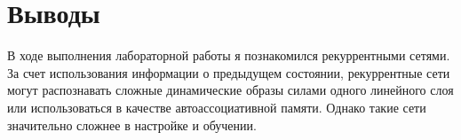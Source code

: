 \section{Выводы}
В ходе выполнения лабораторной работы я познакомился рекуррентными сетями. За счет использования информации о предыдущем состоянии, рекуррентные сети могут распознавать сложные динамические образы силами одного линейного слоя или использоваться в качестве автоассоциативной памяти. Однако такие сети значительно сложнее в настройке и обучении.
\pagebreak
